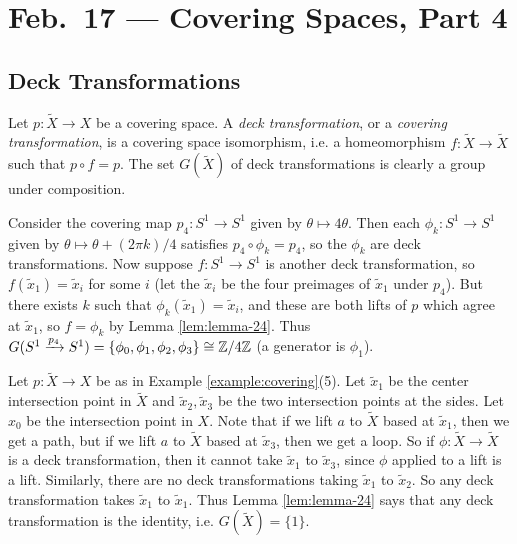 \chapter{Feb.~17 --- Covering Spaces, Part 4}

\section{Deck Transformations}

\begin{definition}
  Let $p : \widetilde{X} \to X$ be a covering
  space. A \emph{deck transformation}, or
  a \emph{covering transformation}, is a
  covering space isomorphism, i.e. a
  homeomorphism $f : \widetilde{X} \to \widetilde{X}$
  such that $p \circ f = p$. The set
  $G(\widetilde{X})$ of deck transformations
  is clearly a group under composition.
\end{definition}

\begin{example}
  Consider the covering map $p_4 : S^1 \to S^1$
  given by $\theta \mapsto 4\theta$.
  Then each $\phi_k : S^1 \to S^1$ given by
  $\theta \mapsto \theta + (2\pi k) / 4$ satisfies
  $p_4 \circ \phi_k = p_4$, so the $\phi_k$ are deck
  transformations. Now suppose $f : S^1 \to S^1$
  is another deck transformation, so
  $f(\widetilde{x}_1) = \widetilde{x}_i$ for some
  $i$ (let the $\widetilde{x}_i$ be the four preimages
  of $\widetilde{x}_1$ under $p_4$).
  But there exists $k$ such that
  $\phi_k(\widetilde{x}_1) = \widetilde{x}_i$,
  and these are both lifts of $p$ which agree at
  $\widetilde{x}_1$, so
  $f = \phi_k$ by Lemma \ref{lem:lemma-24}.
  Thus $G(S^1 \xrightarrow{p_4} S^1) = \{\phi_0, \phi_1, \phi_2, \phi_3\} \cong \mathbb{Z} / 4\mathbb{Z}$ (a generator is $\phi_1$).
\end{example}

\begin{example}
  Let $p : \widetilde{X} \to X$ be as
  in Example \ref{example:covering}(5).
  Let $\widetilde{x}_1$ be the center intersection
  point in
  $\widetilde{X}$ and $\widetilde{x}_2, \widetilde{x}_3$
  be the two intersection points at the sides.
  Let $x_0$ be the intersection point in $X$. Note that
  if we lift $a$ to $\widetilde{X}$ based at
  $\widetilde{x}_1$, then we get a path,
  but if we lift $a$ to $\widetilde{X}$
  based at $\widetilde{x}_3$, then we get a loop.
  So if $\phi : \widetilde{X} \to \widetilde{X}$
  is a deck transformation, then it cannot take
  $\widetilde{x}_1$ to $\widetilde{x}_3$, since
  $\phi$ applied to a lift is a lift. Similarly, there
  are no deck transformations taking $\widetilde{x}_1$
  to $\widetilde{x}_2$. So any deck transformation
  takes $\widetilde{x}_1$ to $\widetilde{x}_1$.
  Thus Lemma \ref{lem:lemma-24} says that any deck
  transformation is the identity, i.e.
  $G(\widetilde{X}) = \{1\}$.
\end{example}

